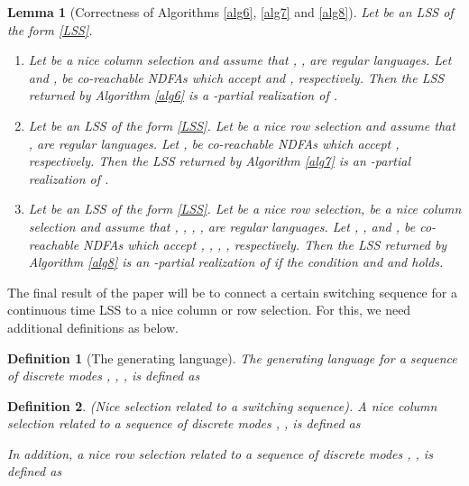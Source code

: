 \documentclass[journal]{IEEEtran}
\newtheorem{Definition}{Definition}
\newtheorem{Lemma}{Lemma}
\begin{document}
\begin{Lemma} [Correctness of Algorithms \ref{alg6}, \ref{alg7} and \ref{alg8}]
	Let  be an LSS of the form \eqref{LSS}.
	\begin{enumerate}
		\item  Let  be a nice column selection and assume that , ,  are regular languages. Let  and ,  be co-reachable NDFAs which accept  and ,  respectively. Then the LSS  returned by Algorithm \ref{alg6} is a -partial realization of .
		
		\item Let  be an LSS of the form \eqref{LSS}. Let  be a nice row selection and assume that ,  are regular languages. Let ,  be co-reachable NDFAs which accept ,  respectively. Then the LSS  returned by Algorithm \ref{alg7} is an -partial realization of .
		
		\item Let  be an LSS of the form \eqref{LSS}. Let  be a nice row selection,  be a nice column selection and assume that , , , ,  are regular languages. Let , ,  and ,  be co-reachable NDFAs which accept , , , ,  respectively. Then the LSS  returned by Algorithm \ref{alg8} is an -partial realization of  if the condition  and  and  holds.
	\end{enumerate}
\end{Lemma}





The final result of the paper will be to connect a certain switching sequence for a continuous time LSS to a nice column or row selection. For this, we need additional definitions as below.



\begin{Definition}[The generating language] \label{def:generating_lang}
	The generating language  for a sequence of discrete modes , , , is defined as
	
\end{Definition}


\begin{Definition} \label{nice_sel_switch_seq}
	\emph{(Nice selection related to a switching sequence).}
	A nice column selection  related to a  sequence
	of discrete modes
	  , ,  is defined as

	In addition, a nice row selection  related to a sequence of discrete modes
	, , 
	is defined as
	
\end{Definition}
\end{document}
